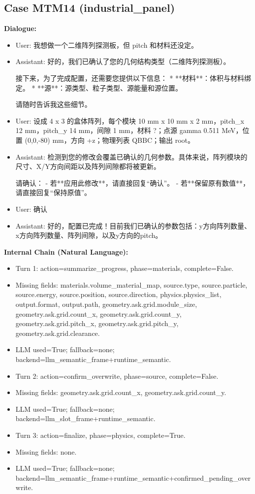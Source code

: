 \documentclass[11pt]{ctexart}
\begin{document}
\subsection{Case MTM14 (industrial\_panel)}
\textbf{Dialogue:}
\begin{itemize}
\item User: 我想做一个二维阵列探测板，但 pitch 和材料还没定。
\item Assistant: 好的，我们已确认了您的几何结构类型（二维阵列探测板）。

接下来，为了完成配置，还需要您提供以下信息：
*   **材料**：体积与材料绑定。
*   **源**：源类型、粒子类型、源能量和源位置。

请随时告诉我这些细节。
\item User: 设成 4 x 3 的盒体阵列，每个模块 10 mm x 10 mm x 2 mm，pitch\_x 12 mm，pitch\_y 14 mm，间隙 1 mm，材料 ?；点源 gamma 0.511 MeV，位置 (0,0,-80) mm，方向 +z；物理列表 QBBC；输出 root。
\item Assistant: 检测到您的修改会覆盖已确认的几何参数。具体来说，阵列模块的尺寸、X/Y方向间距以及阵列间隙都将被更新。

请确认：
- 若**应用此修改**，请直接回复“确认”。
- 若**保留原有数值**，请直接回复“保持原值”。
\item User: 确认
\item Assistant: 好的，配置已完成！目前我们已确认的参数包括：y方向阵列数量、x方向阵列数量、阵列间隙，以及y方向的pitch。
\end{itemize}
\textbf{Internal Chain (Natural Language):}
\begin{itemize}
\item Turn 1: action=summarize\_progress, phase=materials, complete=False.
\item Missing fields: materials.volume\_material\_map, source.type, source.particle, source.energy, source.position, source.direction, physics.physics\_list, output.format, output.path, geometry.ask.grid.module\_size, geometry.ask.grid.count\_x, geometry.ask.grid.count\_y, geometry.ask.grid.pitch\_x, geometry.ask.grid.pitch\_y, geometry.ask.grid.clearance.
\item LLM used=True; fallback=none; backend=llm\_semantic\_frame+runtime\_semantic.
\item Turn 2: action=confirm\_overwrite, phase=source, complete=False.
\item Missing fields: geometry.ask.grid.count\_x, geometry.ask.grid.count\_y.
\item LLM used=True; fallback=none; backend=llm\_slot\_frame+runtime\_semantic.
\item Turn 3: action=finalize, phase=physics, complete=True.
\item Missing fields: none.
\item LLM used=True; fallback=none; backend=llm\_semantic\_frame+runtime\_semantic+confirmed\_pending\_overwrite.
\end{itemize}
\end{document}
